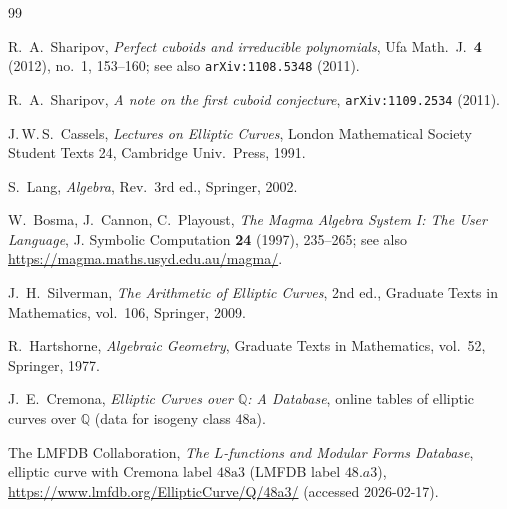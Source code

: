 \documentclass[12pt]{article}
\theoremstyle{remark}
\theoremstyle{definition}
\begin{document}
\begingroup
\footnotesize
\begin{thebibliography}{99}

R.~A.~Sharipov,
\newblock \emph{Perfect cuboids and irreducible polynomials},
\newblock Ufa Math.\ J.\ \textbf{4} (2012), no.~1, 153--160;
\newblock see also \texttt{arXiv:1108.5348} (2011).

R.~A.~Sharipov,
\newblock \emph{A note on the first cuboid conjecture},
\newblock \texttt{arXiv:1109.2534} (2011).

J.\,W.\,S.~Cassels,
\emph{Lectures on Elliptic Curves},
\newblock London Mathematical Society Student Texts 24, Cambridge Univ.\ Press, 1991.

S.~Lang,
\emph{Algebra}, Rev.\ 3rd ed., Springer, 2002.

W.~Bosma, J.~Cannon, C.~Playoust,
\newblock \emph{The Magma Algebra System I: The User Language},
\newblock J. Symbolic Computation \textbf{24} (1997), 235--265;
\newblock see also \url{https://magma.maths.usyd.edu.au/magma/}.

J.~H.~Silverman,
\newblock \emph{The Arithmetic of Elliptic Curves}, 2nd ed.,
\newblock Graduate Texts in Mathematics, vol.~106, Springer, 2009.

R.~Hartshorne,
\newblock \emph{Algebraic Geometry},
\newblock Graduate Texts in Mathematics, vol.~52, Springer, 1977.

J.~E.~Cremona,
\newblock \emph{Elliptic Curves over $\mathbb{Q}$: A Database},
\newblock online tables of elliptic curves over $\mathbb{Q}$ (data for isogeny class $48\mathrm{a}$).

The LMFDB Collaboration,
\newblock \emph{The $L$-functions and Modular Forms Database},
\newblock elliptic curve with Cremona label $48\mathrm{a}3$ (LMFDB label $48.a3$),
\url{https://www.lmfdb.org/EllipticCurve/Q/48a3/} (accessed 2026-02-17).

\end{thebibliography}
\endgroup
\end{document}
